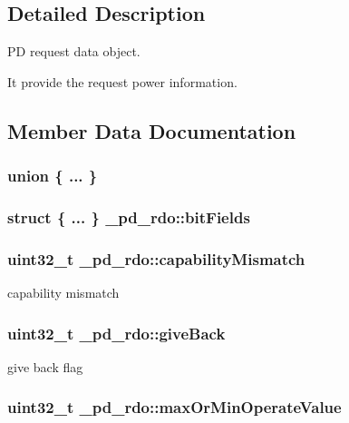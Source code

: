 \subsection{Detailed Description}
P\-D request data object. 

It provide the request power information. 

\subsection{Member Data Documentation}
\hypertarget{struct__pd__rdo_a2644a485a37f29cec32c4ae304b3a272}{\subsubsection[{"@53}]{\setlength{\rightskip}{0pt plus 5cm}union \{ ... \} }}\label{struct__pd__rdo_a2644a485a37f29cec32c4ae304b3a272}
\hypertarget{struct__pd__rdo_acd03d551b682b870d0e30be5819d013e}{
\subsubsection[{bit\-Fields}]{\setlength{\rightskip}{0pt plus 5cm}struct \{ ... \}   \-\_\-pd\-\_\-rdo\-::bit\-Fields}}\label{struct__pd__rdo_acd03d551b682b870d0e30be5819d013e}
\hypertarget{struct__pd__rdo_afa835644625bbc35646580cb9bbd9b66}{
\subsubsection[{capability\-Mismatch}]{\setlength{\rightskip}{0pt plus 5cm}uint32\-\_\-t \-\_\-pd\-\_\-rdo\-::capability\-Mismatch}}\label{struct__pd__rdo_afa835644625bbc35646580cb9bbd9b66}
capability mismatch \hypertarget{struct__pd__rdo_a82acd4a018e44108ae1cb59e1da734b2}{
\subsubsection[{give\-Back}]{\setlength{\rightskip}{0pt plus 5cm}uint32\-\_\-t \-\_\-pd\-\_\-rdo\-::give\-Back}}\label{struct__pd__rdo_a82acd4a018e44108ae1cb59e1da734b2}
give back flag \hypertarget{struct__pd__rdo_a75142d4da1d2a5049e134f771854ff7b}{
\subsubsection[{max\-Or\-Min\-Operate\-Value}]{\setlength{\rightskip}{0pt plus 5cm}uint32\-\_\-t \-\_\-pd\-\_\-rdo\-::max\-Or\-Min\-Operate\-Value}}\label{struct__pd__rdo_a75142d4da1d2a5049e134f771854ff7b}

